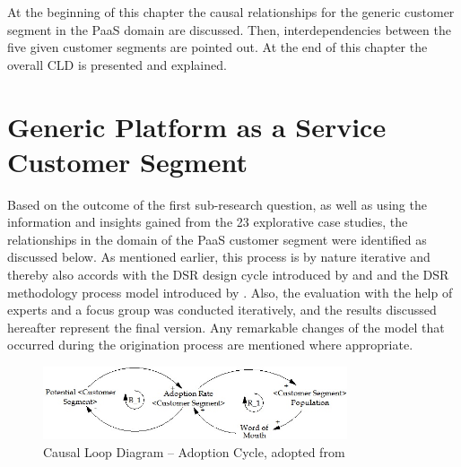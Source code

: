 At the beginning of this chapter the causal relationships for the generic customer segment in the \ac{PaaS} domain are discussed. Then, interdependencies between the five given customer segments are pointed out. At the end of this chapter the overall \ac{CLD} is presented and explained.

\section{Generic Platform as a Service Customer Segment}\label{ch:cld:cs}

Based on the outcome of the first sub-research question, as well as using the information and insights gained from the 23 explorative case studies, the relationships in the domain of the \ac{PaaS} customer segment were identified as discussed below. As mentioned earlier, this process is by nature iterative and thereby also accords with the \ac{DSR} design cycle introduced by \citet{Hevner2004} and \citet{Hevner2007} and the \ac{DSR} methodology process model introduced by \citet{Peffers2007}. Also, the evaluation with the help of experts and a focus group was conducted iteratively, and the results discussed hereafter represent the final version. Any remarkable changes of the model that occurred during the origination process are mentioned where appropriate.

\begin{figure}[tb]
	\centering
	\includegraphics[width=0.8\textwidth]{gfx/cld_adoptionRate}
	\caption[Causal Loop Diagram -- Adoption Cycle]{Causal Loop Diagram -- Adoption Cycle, adopted from \citet[p. 18]{Sterman2001}}
	\label{fig:cld_ac}
\end{figure}


